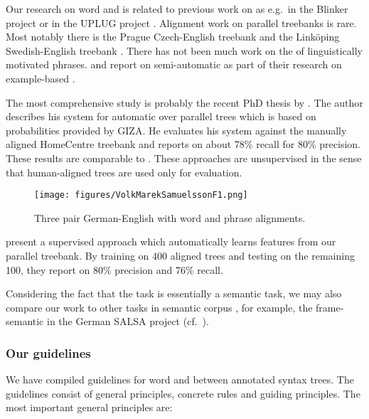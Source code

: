 \documentclass[output=paper]{LSP/langsci}
\begin{document}
Our research on word and  is related to previous work on  as e.g.~in the Blinker project \citep{Melamed1998} or in the UPLUG project \citep{AhrenbergEtAl2003}. Alignment work on parallel treebanks is rare. Most notably there is the Prague Czech-English treebank \citep{Kruijff-KorbayováEtAl2006} and the Linköping Swedish-English treebank \citep{Ahrenberg2007}. There has not been much work on the  of linguistically motivated phrases. \citet{TinsleyEtAl2007} and \citet{GrovesEtAl2004} report on semi-automatic  as part of their research on example-based . 

The most comprehensive study is probably the recent PhD thesis by \citet{Zhechev2009}. The author describes his system for automatic  over parallel trees which is based on  probabilities provided by GIZA. He evaluates his system against the manually aligned HomeCentre treebank and reports on about 78\% recall for 80\% precision. These results are comparable to \citet{Ambati2008}. These approaches are unsupervised in the sense that human-aligned trees are used only for evaluation. 

\begin{figure}
\texttt{[image: figures/VolkMarekSamuelssonF1.png]}
\caption{Three pair German-English with word and phrase alignments.}
\label{fig:volkmareksamuelsson:1}
\end{figure}

\citet{Tiedemann2009} present a supervised approach which automatically learns  features from our parallel treebank. By training on 400 aligned trees and testing on the remaining 100, they report on 80\% precision and 76\% recall. 


Considering the fact that the  task is essentially a semantic  task, we may also compare our work to other tasks in semantic corpus , for example, the frame-semantic  in the German SALSA project (cf.~\citealt{BurchardtEtAl2006}).

\subsubsection{Our  guidelines}\label{sec:volk:2.2.2}

We have compiled  guidelines for word and  between annotated syntax trees. The guidelines consist of general principles, concrete rules and guiding principles. The most important general principles are: 
\end{document}
